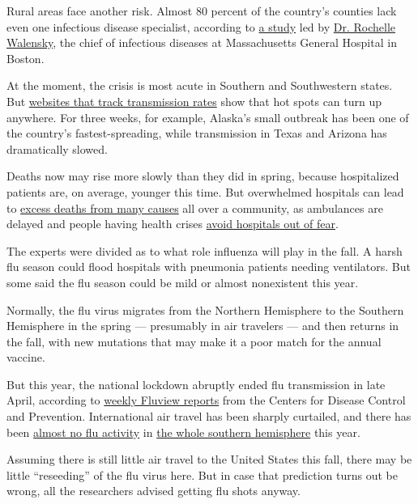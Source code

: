 Rural areas face another risk. Almost 80 percent of the country's
counties lack even one infectious disease specialist, according to
\href{https://www.acpjournals.org/doi/10.7326/M20-2684}{a study} led by
\href{https://www.massgeneral.org/doctors/17245/rochelle-walensky}{Dr.
Rochelle Walensky}, the chief of infectious diseases at Massachusetts
General Hospital in Boston.

At the moment, the crisis is most acute in Southern and Southwestern
states. But \href{https://rt.live/}{websites that track transmission
rates} show that hot spots can turn up anywhere. For three weeks, for
example, Alaska's small outbreak has been one of the country's
fastest-spreading, while transmission in Texas and Arizona has
dramatically slowed.

Deaths now may rise more slowly than they did in spring, because
hospitalized patients are, on average, younger this time. But
overwhelmed hospitals can lead to
\href{https://www.nytimes3xbfgragh.onion/interactive/2020/06/01/us/coronavirus-deaths-new-york-new-jersey.html}{excess
deaths from many causes} all over a community, as ambulances are delayed
and people having health crises
\href{https://www.nytimes3xbfgragh.onion/2020/06/09/opinion/coronavirus-hospitals-deaths.html}{avoid
hospitals out of fear}.

The experts were divided as to what role influenza will play in the
fall. A harsh flu season could flood hospitals with pneumonia patients
needing ventilators. But some said the flu season could be mild or
almost nonexistent this year.

Normally, the flu virus migrates from the Northern Hemisphere to the
Southern Hemisphere in the spring --- presumably in air travelers ---
and then returns in the fall, with new mutations that may make it a poor
match for the annual vaccine.

But this year, the national lockdown abruptly ended flu transmission in
late April, according to
\href{https://www.cdc.gov/flu/weekly/index.htm}{weekly Fluview reports}
from the Centers for Disease Control and Prevention. International air
travel has been sharply curtailed, and there has been
\href{https://www.abc.net.au/news/2020-06-13/flu-cases-drop-amid-coronavirus-restrictions-statistics-show/12332204}{almost
no flu activity} in
\href{https://www.wsj.com/articles/covid-19-measures-have-all-but-wiped-out-the-flu-in-the-southern-hemisphere-11595440682}{the
whole southern hemisphere} this year.

Assuming there is still little air travel to the United States this
fall, there may be little ``reseeding'' of the flu virus here. But in
case that prediction turns out be wrong, all the researchers advised
getting flu shots anyway.

